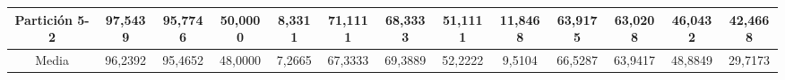 \documentclass[12pt]{article}
\begin{document}
\begin{table}[H]
{\begin{tabular}{|c|cccc|cccc|cccc|}
Partición 5-2 & \multicolumn{1}{c|}{97,5439}                                                  & \multicolumn{1}{c|}{95,7746}                                                 & \multicolumn{1}{c|}{50,0000} & 8,3311  & \multicolumn{1}{c|}{71,1111}                                                  & \multicolumn{1}{c|}{68,3333}                                                 & \multicolumn{1}{c|}{51,1111} & 11,8468 & \multicolumn{1}{c|}{63,9175}                                                  & \multicolumn{1}{c|}{63,0208}                                                 & \multicolumn{1}{c|}{46,0432} & 42,4668 \\ \hline
Media         & \multicolumn{1}{c|}{96,2392}                                                  & \multicolumn{1}{c|}{95,4652}                                                 & \multicolumn{1}{c|}{48,0000} & 7,2665  & \multicolumn{1}{c|}{67,3333}                                                  & \multicolumn{1}{c|}{69,3889}                                                 & \multicolumn{1}{c|}{52,2222} & 9,5104  & \multicolumn{1}{c|}{66,5287}                                                  & \multicolumn{1}{c|}{63,9417}                                                 & \multicolumn{1}{c|}{48,8849} & 29,7173 \\ \hline
\end{tabular}}
\end{table}
\end{document}
